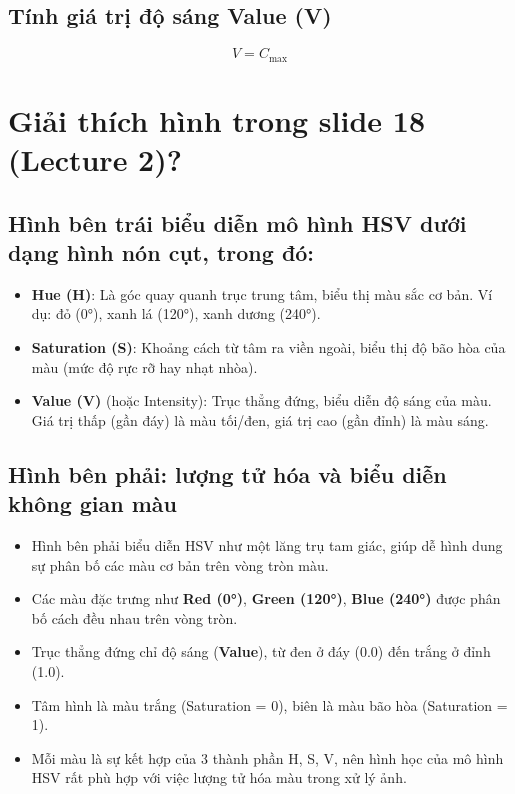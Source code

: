 \documentclass[12pt]{article}
\begin{document}
	\subsection{Tính giá trị độ sáng Value (V)}
	
	\[
	V = C_{\text{max}}
	\]
	
	\section{ Giải thích hình trong slide 18 (Lecture 2)?}
	
	\subsection*{Hình bên trái biểu diễn mô hình HSV dưới dạng hình nón cụt, trong đó:}
	
	\begin{itemize}
	\item \textbf{Hue (H)}: Là góc quay quanh trục trung tâm, biểu thị màu sắc cơ bản. Ví dụ: đỏ (0°), xanh lá (120°), xanh dương (240°).
	\item \textbf{Saturation (S)}: Khoảng cách từ tâm ra viền ngoài, biểu thị độ bão hòa của màu (mức độ rực rỡ hay nhạt nhòa).
	\item \textbf{Value (V)} (hoặc Intensity): Trục thẳng đứng, biểu diễn độ sáng của màu. Giá trị thấp (gần đáy) là màu tối/đen, giá trị cao (gần đỉnh) là màu sáng.
	\end{itemize}
	
	\subsection*{Hình bên phải: lượng tử hóa và biểu diễn không gian màu}
	
	\begin{itemize}
	\item Hình bên phải biểu diễn HSV như một lăng trụ tam giác, giúp dễ hình dung sự phân bố các màu cơ bản trên vòng tròn màu.
	\item Các màu đặc trưng như \textbf{Red (0°)}, \textbf{Green (120°)}, \textbf{Blue (240°)} được phân bố cách đều nhau trên vòng tròn.
	\item Trục thẳng đứng chỉ độ sáng (\textbf{Value}), từ đen ở đáy (0.0) đến trắng ở đỉnh (1.0).
	\item Tâm hình là màu trắng (Saturation = 0), biên là màu bão hòa (Saturation = 1).
	\item Mỗi màu là sự kết hợp của 3 thành phần H, S, V, nên hình học của mô hình HSV rất phù hợp với việc lượng tử hóa màu trong xử lý ảnh.
	\end{itemize}
	
\end{document}
